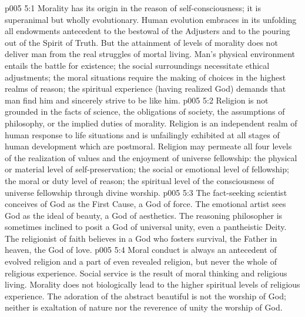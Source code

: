 \vs p005 5:1 Morality has its origin in the reason of self\hyp{}consciousness; it is superanimal but wholly evolutionary. Human evolution embraces in its unfolding all endowments antecedent to the bestowal of the Adjusters and to the pouring out of the Spirit of Truth. But the attainment of levels of morality does not deliver man from the real struggles of mortal living. Man’s physical environment entails the battle for existence; the social surroundings necessitate ethical adjustments; the moral situations require the making of choices in the highest realms of reason; the spiritual experience (having realized God) demands that man find him and sincerely strive to be like him.
\vs p005 5:2 Religion is not grounded in the facts of science, the obligations of society, the assumptions of philosophy, or the implied duties of morality. Religion is an independent realm of human response to life situations and is unfailingly exhibited at all stages of human development which are postmoral. Religion may permeate all four levels of the realization of values and the enjoyment of universe fellowship: the physical or material level of self\hyp{}preservation; the social or emotional level of fellowship; the moral or duty level of reason; the spiritual level of the consciousness of universe fellowship through divine worship.
\vs p005 5:3 The fact\hyp{}seeking scientist conceives of God as the First Cause, a God of force. The emotional artist sees God as the ideal of beauty, a God of aesthetics. The reasoning philosopher is sometimes inclined to posit a God of universal unity, even a pantheistic Deity. The religionist of faith believes in a God who fosters survival, the Father in heaven, the God of love.
\vs p005 5:4 \pc Moral conduct is always an antecedent of evolved religion and a part of even revealed religion, but never the whole of religious experience. Social service is the result of moral thinking and religious living. Morality does not biologically lead to the higher spiritual levels of religious experience. The adoration of the abstract beautiful is not the worship of God; neither is exaltation of nature nor the reverence of unity the worship of God.
